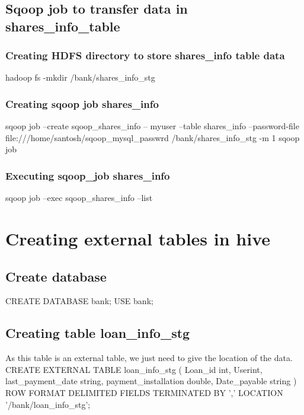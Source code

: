 \subsection{Sqoop job to transfer data in shares\_info\_table}
\subsubsection{Creating HDFS directory to store shares\_info table data}
hadoop fs -mkdir /bank/shares\_info\_stg
\subsubsection{Creating sqoop job shares\_info}
sqoop job --create sqoop\_shares\_info -- myuser --table shares\_info --password-file \newline file:///home/santosh/sqoop\_mysql\_passwrd
/bank/shares\_info\_stg -m 1
sqoop job
\subsubsection{Executing sqoop\_job shares\_info}
sqoop job --exec sqoop\_shares\_info
--list
\section{Creating external tables in hive}
\subsection{Create database}
CREATE DATABASE bank; \newline
USE bank;
\subsection{Creating table loan\_info\_stg}
As this table is an external table, we just need to give the \newline location of the data.\newline
CREATE EXTERNAL TABLE loan\_info\_stg ( \newline
Loan\_id int,\newline
User\id int,\newline
last\_payment\_date string,\newline
payment\_installation double,\newline
Date\_payable string\newline
) ROW FORMAT DELIMITED FIELDS TERMINATED BY\newline
',' LOCATION '/bank/loan\_info\_stg';\newline

